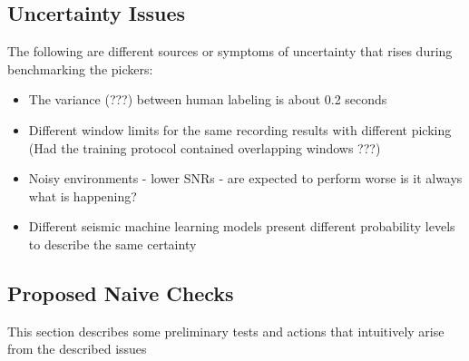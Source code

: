 \documentclass[11pt,a4paper]{article}
\begin{document}
\subsection{Uncertainty Issues}
The following are different sources or symptoms of uncertainty that rises during benchmarking the pickers:
\begin{itemize}
\item The variance (???) between human labeling is about 0.2 seconds 
\item Different window limits for the same recording results with different picking (Had the training protocol contained overlapping windows ???)
\item Noisy environments - lower SNRs - are expected to perform worse is it always what is happening? 
\item Different seismic machine learning models present different probability levels to describe the same certainty 
\end{itemize}


\subsection{Proposed Naive Checks}
This section describes some preliminary tests and actions that intuitively arise from the described issues
\end{document}
